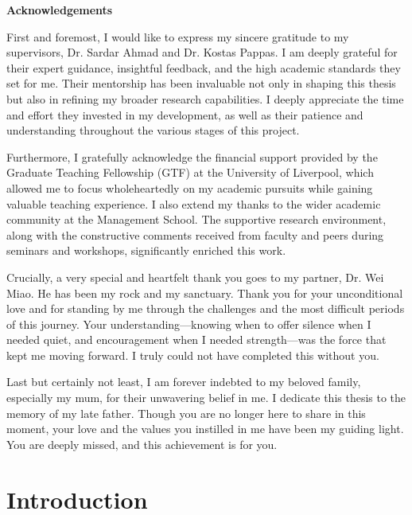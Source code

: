 \documentclass[12pt, a4paper]{report}
\begin{document}
\thispagestyle{plain}
\begin{center}
    {\Large \bfseries Acknowledgements \par}
\end{center}
\vspace{0.5cm}

First and foremost, I would like to express my sincere gratitude to my supervisors, Dr. Sardar Ahmad and Dr. Kostas Pappas. I am deeply grateful for their expert guidance, insightful feedback, and the high academic standards they set for me. Their mentorship has been invaluable not only in shaping this thesis but also in refining my broader research capabilities. I deeply appreciate the time and effort they invested in my development, as well as their patience and understanding throughout the various stages of this project.


Furthermore, I gratefully acknowledge the financial support provided by the Graduate Teaching Fellowship (GTF) at the University of Liverpool, which allowed me to focus wholeheartedly on my academic pursuits while gaining valuable teaching experience. I also extend my thanks to the wider academic community at the Management School. The supportive research environment, along with the constructive comments received from faculty and peers during seminars and workshops, significantly enriched this work.


Crucially, a very special and heartfelt thank you goes to my partner, Dr. Wei Miao. He has been my rock and my sanctuary. Thank you for your unconditional love and for standing by me through the challenges and the most difficult periods of this journey. Your understanding—knowing when to offer silence when I needed quiet, and encouragement when I needed strength—was the force that kept me moving forward. I truly could not have completed this without you.


Last but certainly not least, I am forever indebted to my beloved family, especially my mum, for their unwavering belief in me. I dedicate this thesis to the memory of my late father. Though you are no longer here to share in this moment, your love and the values you instilled in me have been my guiding light. You are deeply missed, and this achievement is for you.

\newpage

\tableofcontents
\newpage
\listoftables
\newpage
\listoffigures
\newpage
{}

\chapter{Introduction}
\end{document}
